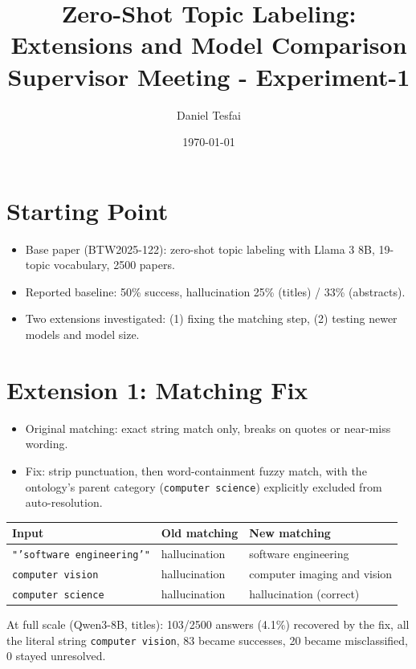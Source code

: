 \documentclass[12pt]{article}
\title{\sffamily\vspace{-2em} Zero-Shot Topic Labeling: Extensions and Model Comparison\\[0.3em]\large Supervisor Meeting - Experiment-1}
\author{\sffamily Daniel Tesfai}
\date{\sffamily \today}
\begin{document}
\maketitle
\vspace{-1.5em}

\section{Starting Point}

\begin{itemize}
    \item Base paper (BTW2025-122): zero-shot topic labeling with Llama 3 8B, 19-topic vocabulary, 2500 papers.
    \item Reported baseline: 50\% success, hallucination 25\% (titles) / 33\% (abstracts).
    \item Two extensions investigated: (1) fixing the matching step, (2) testing newer models and model size.
\end{itemize}

\FloatBarrier
\section{Extension 1: Matching Fix}

\begin{itemize}
    \item Original matching: exact string match only, breaks on quotes or near-miss wording.
    \item Fix: strip punctuation, then word-containment fuzzy match, with the ontology's parent category (\texttt{computer science}) explicitly excluded from auto-resolution.
\end{itemize}

\begin{table}[h]
\centering
\begin{tabular}{lll}
\toprule
Input & Old matching & New matching \\
\midrule
\texttt{"'software engineering'"} & hallucination & software engineering \\
\texttt{computer vision} & hallucination & computer imaging and vision \\
\texttt{computer science} & hallucination & hallucination (correct) \\
\bottomrule
\end{tabular}
\end{table}

At full scale (Qwen3-8B, titles): 103/2500 answers (4.1\%) recovered by the fix, all the literal string \texttt{computer vision}, 83 became successes, 20 became misclassified, 0 stayed unresolved.
\end{document}
